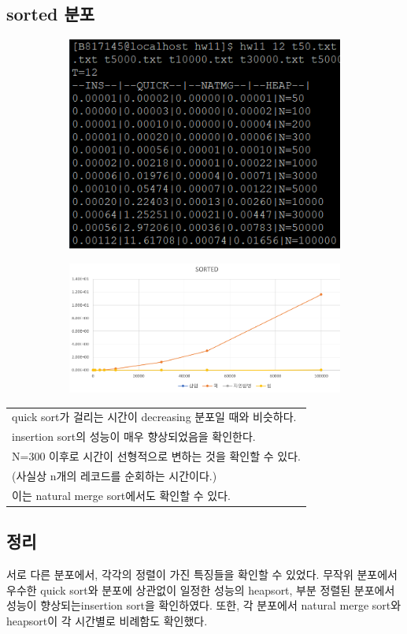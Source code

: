 \documentclass{article}
\begin{document}
\subsection{sorted 분포}
\begin{figure}[H]
\begin{subfigure}[ht]{.3\linewidth}\centering
\includegraphics[width=.9\linewidth]{sorted2.PNG}
\end{subfigure}
\begin{subfigure}[ht]{.7\linewidth}\centering
\includegraphics[width=.9\linewidth]{sorted.PNG}
\end{subfigure}
\end{figure}
\begin{table}[H]
\centering
\begin{tabular}{|m{15cm}|}
\hline
quick sort가 걸리는 시간이 decreasing 분포일 때와 비슷하다.\\
insertion sort의 성능이 매우 향상되었음을 확인한다.\\
N=300 이후로 시간이 선형적으로 변하는 것을 확인할 수 있다.\\
(사실상 n개의 레코드를 순회하는 시간이다.)\\
이는 natural merge sort에서도 확인할 수 있다.\\
\hline
\end{tabular}
\end{table}

\subsection{정리}
서로 다른 분포에서, 각각의 정렬이 가진 특징들을 확인할 수 있었다. 무작위 분포에서 우수한 quick sort와 분포에 상관없이 일정한 성능의 heapsort, 부분 정렬된 분포에서 성능이 향상되는insertion sort을 확인하였다. 또한, 각 분포에서 natural merge sort와 heapsort이 각 시간별로 비례함도 확인했다.\\
\end{document}
